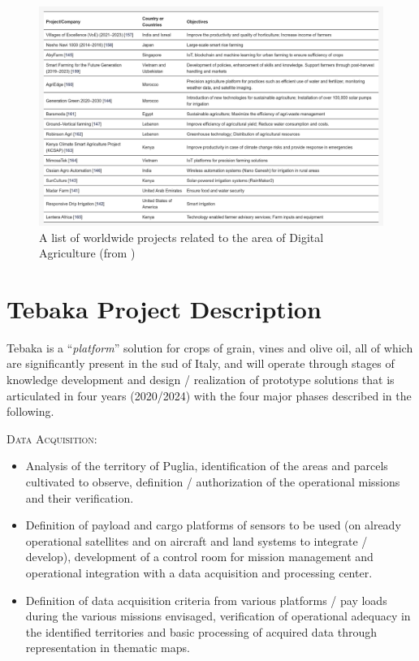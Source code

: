 \documentclass[comsoc,final]{IEEEtran}
\begin{document}
\begin{figure}
    \centering
    \includegraphics[width=\columnwidth]{research-table}
    \caption{A list of worldwide projects related to the area of Digital Agriculture (from \cite{agriengineering4020029})}
    \label{fig:table-worldwide}
\end{figure}


\section{Tebaka Project Description}\label{sec:tebaka}

Tebaka is a “\emph{platform}” solution for crops of grain, vines and olive oil, all of which are significantly present in the sud of Italy, and will operate through stages of knowledge development and design / realization of prototype solutions that is articulated in four years (2020/2024) with the four major phases described in the following.

\textsc{Data Acquisition:}

\begin{itemize}
\item Analysis of the territory of Puglia, identification of the areas and parcels cultivated to observe, definition / authorization of the operational missions and their verification.
\item Definition of payload and cargo platforms of sensors to be used (on already operational satellites and on aircraft and land systems to integrate / develop), development of a control room for mission management and operational integration with a data acquisition and processing center.
\item Definition of data acquisition criteria from various platforms / pay loads during the various missions envisaged, verification of operational adequacy in the identified territories and basic processing of acquired data through representation in thematic maps.
\end{itemize}
\end{document}

